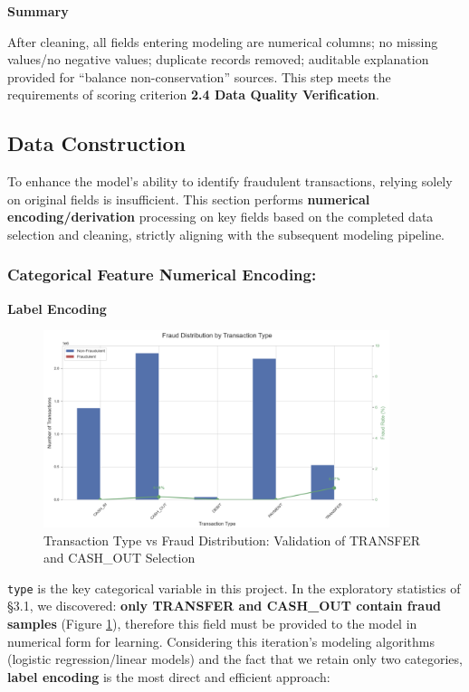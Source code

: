 \documentclass[sigplan,screen]{acmart}
\begin{document}
\textbf{Summary}

After cleaning, all fields entering modeling are numerical columns; no missing values/no negative values; duplicate records removed; auditable explanation provided for ``balance non-conservation'' sources. This step meets the requirements of scoring criterion \textbf{2.4 Data Quality Verification}.

\subsection{Data Construction}

To enhance the model's ability to identify fraudulent transactions, relying solely on original fields is insufficient. This section performs \textbf{numerical encoding/derivation} processing on key fields based on the completed data selection and cleaning, strictly aligning with the subsequent modeling pipeline.

\subsubsection{Categorical Feature Numerical Encoding:}

\textbf{Label Encoding}

\begin{figure}[h!]
    \centering
    \includegraphics[width=0.9\textwidth]{3.3.png}
    \caption{Transaction Type vs Fraud Distribution: Validation of TRANSFER and CASH\_OUT Selection}
    \label{fig:type_fraud_encoding}
\end{figure}

\texttt{type} is the key categorical variable in this project. In the exploratory statistics of \S3.1, we discovered: \textbf{only TRANSFER and CASH\_OUT contain fraud samples} (Figure \ref{fig:type_fraud_encoding}), therefore this field must be provided to the model in numerical form for learning. Considering this iteration's modeling algorithms (logistic regression/linear models) and the fact that we retain only two categories, \textbf{label encoding} is the most direct and efficient approach:
\end{document}

